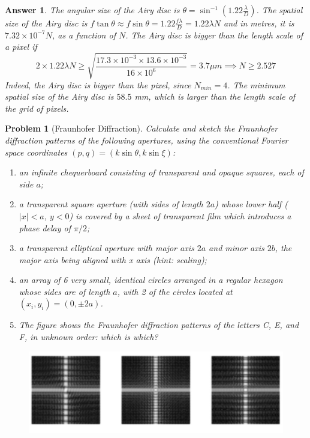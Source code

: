 \documentclass[a4paper]{article}
\newtheorem{ans}{Answer}[section]
\theoremstyle{new}
\newtheorem{qns}{Problem}[section]
\begin{document}
\begin{ans}
The angular size of the Airy disc is $\theta=\sin^{-1}(1.22\frac{\lambda}{D})$. The spatial size of the Airy disc is $f\tan\theta\approx f\sin\theta=1.22\frac{f\lambda}{D}=1.22\lambda N$ and in metres, it is $7.32\times10^{-7}N$, as a function of $N$. The Airy disc is bigger than the length scale of a pixel if 
$$2\times 1.22\lambda N\geq\sqrt{\frac{17.3\times10^{-3}\times 13.6\times10^{-3}}{16\times10^6}}=3.7\mu m\implies N\geq 2.527$$
Indeed, the Airy disc is bigger than the pixel, since $N_{min}=4$. The minimum spatial size of the Airy disc is $58.5$ mm, which is larger than the length scale of the grid of pixels.
\end{ans}
\begin{qns}[Fraunhofer Diffraction]
Calculate and sketch the Fraunhofer diffraction patterns of the following apertures, using the conventional Fourier space coordinates $(p,q)=(k\sin\theta,k\sin\xi)$:
\begin{enumerate}[label=(\alph*)]
    \item an infinite chequerboard consisting of transparent and opaque squares, each of side $a$;
    \item a transparent square aperture (with sides of length $2a$) whose lower half ($|x|<a$, $y<0$) is covered by a sheet of transparent film which introduces a phase delay of $\pi/2$;
    \item a transparent elliptical aperture with major axis $2a$ and minor axis $2b$, the major axis being aligned with x axis (hint: scaling);
    \item an array of 6 very small, identical circles arranged in a regular hexagon whose sides are of length $a$, with 2 of the circles located at $(x_i, y_i) = (0,\pm 2a)$.
    \item The figure shows the Fraunhofer diffraction patterns of the letters C, E, and F, in unknown order: which is which?
\end{enumerate}
\begin{figure}[H]
    \centering
    \includegraphics[width=\linewidth]{2_24.PNG}
\end{figure}
\end{qns}
\end{document}
